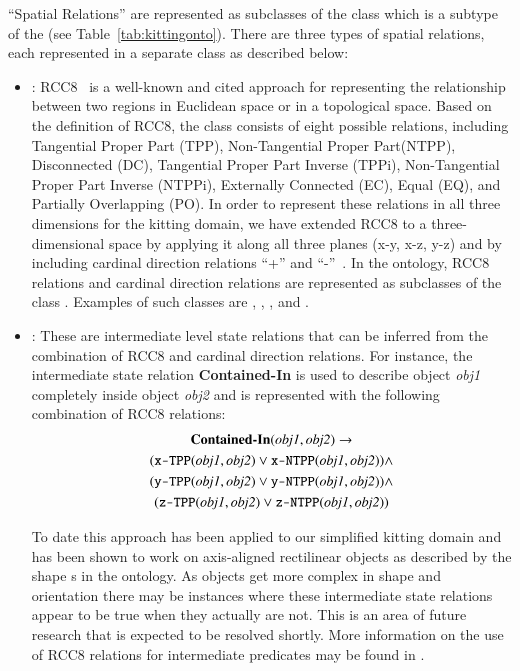 ``Spatial Relations'' are represented as subclasses of the 
class which is a subtype of the  (see Table~\ref{tab:kittingonto}).
There are three types of spatial relations, each represented in a separate class as described below:
\begin{itemize}
 \item {}: RCC8~\cite{Wolter.KR.2000} is a well-known and cited
approach for representing the relationship between two regions in Euclidean space or
in a topological space. Based on the definition of RCC8, the class 
consists of eight possible relations, including Tangential Proper Part (TPP), Non-Tangential
Proper Part(NTPP), Disconnected (DC), Tangential Proper Part Inverse (TPPi), Non-Tangential
Proper Part Inverse (NTPPi), Externally Connected (EC), Equal (EQ), and Partially
Overlapping (PO). In order to represent these relations in all three dimensions for the
kitting domain, we have extended RCC8 to a three-dimensional space by applying it along
all three planes (x-y, x-z, y-z) and by including cardinal direction relations ``+''
and ``-''~\cite{SCHLENOFF.ECDRM.2012}. In the ontology, RCC8 relations and cardinal direction
relations are represented as subclasses of the class . Examples of
such classes are , , , and .

 \item {}: These are intermediate level state relations
that can be inferred from the combination of RCC8 and cardinal direction relations. For
instance, the intermediate state relation \textbf{Contained-In} is used to describe object
\textit{obj1} completely inside object \textit{obj2} and is represented with the following combination of RCC8 relations:
\begin{gather}
\textbf{Contained-In}(\textit{obj1}, \textit{obj2}) \rightarrow   \notag\\
(\texttt{x-TPP}(\textit{obj1}, \textit{obj2}) \vee \texttt{x-NTPP}(\textit{obj1}, \textit{obj2})) \wedge \notag\\
(\texttt{y-TPP}(\textit{obj1}, \textit{obj2}) \vee \texttt{y-NTPP}(\textit{obj1}, \textit{obj2})) \wedge \notag\\
(\texttt{z-TPP}(\textit{obj1}, \textit{obj2}) \vee \texttt{z-NTPP}(\textit{obj1}, \textit{obj2}))\notag
\end{gather}

To date this approach has been applied to our simplified kitting domain and has been shown to work on axis-aligned 
rectilinear objects as described by the shape s in the ontology. As objects get more complex 
in shape and orientation there may be instances where these intermediate state relations appear to be true 
when they actually are not. This is an area of future research that is expected to be resolved shortly. 
More information on the use of RCC8 relations for intermediate predicates may be found in \cite{Schlenoff2012}.


\end{itemize}
